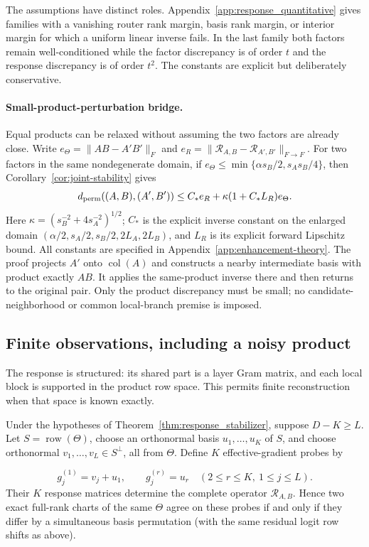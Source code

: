 The assumptions have distinct roles. Appendix~\ref{app:response_quantitative}
gives families with a vanishing router rank margin, basis rank margin,
or interior margin for which a uniform linear inverse fails. In the last
family both factors remain well-conditioned while the factor discrepancy
is of order $t$ and the response discrepancy is of order $t^2$.
The constants are explicit but deliberately conservative.

\paragraph{Small-product-perturbation bridge.}
Equal products can be relaxed without assuming the two factors are already
close. Write $e_\Theta=\|AB-A'B'\|_F$ and
$e_R=\|\mathcal R_{A,B}-\mathcal R_{A',B'}\|_{F\to F}$.
For two factors in the same nondegenerate domain, if
$e_\Theta\le\min\{\alpha s_B/2,s_As_B/4\}$, then
Corollary~\ref{cor:joint-stability} gives
\begin{equation}
 d_{\rm perm}((A,B),(A',B'))
 \le C_*e_R+\kappa(1+C_*L_R)e_\Theta.
 \label{eq:joint-main}
\end{equation}
Here $\kappa=(s_B^{-2}+4s_A^{-2})^{1/2}$; $C_*$ is the explicit inverse
constant on the enlarged domain
$(\alpha/2,s_A/2,s_B/2,2L_A,2L_B)$, and $L_R$ is its explicit forward
Lipschitz bound. All constants are specified in
Appendix~\ref{app:enhancement-theory}.
The proof projects $A'$ onto $\operatorname{col}(A)$ and constructs a nearby
intermediate basis with product exactly $AB$. It applies the same-product
inverse there and then returns to the original pair.
Only the product discrepancy must be small; no candidate-neighborhood or
common local-branch premise is imposed.

\subsection{Finite observations, including a noisy product}
\label{sec:finite-observations}

The response is structured: its shared part is a layer Gram matrix, and
each local block is supported in the product row space. This permits
finite reconstruction when that space is known exactly.

\begin{corollary}
\label{cor:response_tomography}
Under the hypotheses of Theorem~\ref{thm:response_stabilizer}, suppose
$D-K\ge L$.  Let $S=\operatorname{row}(\Theta)$, choose an orthonormal
basis $u_1,\ldots,u_K$ of $S$, and choose orthonormal
$v_1,\ldots,v_L\in S^\perp$, all from \(\Theta\).  Define $K$ effective-gradient
probes by

\[
 g_j^{(1)}=v_j+u_1,
 \qquad
 g_j^{(r)}=u_r\quad(2\le r\le K,\ 1\le j\le L).
\]
Their $K$ response matrices determine the complete operator
$\mathcal R_{A,B}$.  Hence two exact full-rank charts of the same \(\Theta\)
agree on these probes if and only if they differ by a simultaneous basis
permutation (with the same residual logit row shifts as above).
\end{corollary}


